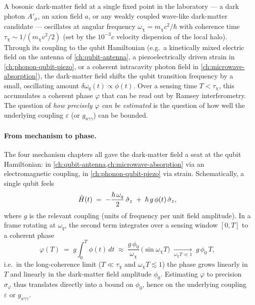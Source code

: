 \begin{phenomenon}
A bosonic dark-matter field at a single fixed point in the
laboratory --- a dark photon $A'_\mu$, an axion field $a$, or
any weakly coupled wave-like dark-matter candidate ---
oscillates at angular frequency $\omega_\chi=m_\chi c^2/\hbar$
with coherence time $\tau_\chi\sim 1/(m_\chi v^2/2)$ (set by the
$10^{-3}c$ velocity dispersion of the local halo). Through its
coupling to the qubit Hamiltonian (e.g.\ a kinetically mixed
electric field on the antenna of \cref{ch:qubit-antenna}, a
piezoelectrically driven strain in
\cref{ch:phonon-qubit-piezo}, or a coherent intracavity photon
field in \cref{ch:microwave-absorption}), the dark-matter
field shifts the qubit transition frequency by a small,
oscillating amount $\delta\omega_q(t)\propto\phi(t)$. Over a
sensing time $T<\tau_\chi$, this accumulates a coherent
phase $\varphi$ that can be read out by Ramsey
interferometry. The question of \emph{how precisely
$\varphi$ can be estimated} is the question of how well the
underlying coupling $\varepsilon$ (or $g_{a\gamma\gamma}$) can
be bounded.
\end{phenomenon}

\paragraph{From mechanism to phase.}
The four mechanism chapters all gave the dark-matter field a
seat at the qubit Hamiltonian: in
\cref{ch:qubit-antenna,ch:microwave-absorption} via an
electromagnetic coupling, in \cref{ch:phonon-qubit-piezo} via
strain. Schematically, a single qubit feels
\begin{equation}
\label{eq:dm-phase-hamiltonian}
\hat{H}(t) \;=\; -\frac{\hbar\,\omega_q}{2}\,\hat\sigma_z
\;+\; \hbar\,g\,\phi(t)\,\hat\sigma_z,
\end{equation}
where $g$ is the relevant coupling (units of frequency per unit
field amplitude). In a frame rotating at $\omega_q$, the second
term integrates over a sensing window $[0,T]$ to a coherent
phase
\begin{equation}
\label{eq:dm-phase-integral}
\varphi(T) \;=\; g \int_0^T\! \phi(t)\,dt \;\approx\;
\frac{g\,\phi_0}{\omega_\chi}\,
\bigl(\sin\omega_\chi T\bigr)
\;\xrightarrow[\omega_\chi T\ll 1]{}\;
g\,\phi_0\,T,
\end{equation}
i.e.\ in the long-coherence limit ($T\ll\tau_\chi$ and
$\omega_\chi T\lesssim 1$) the phase grows linearly in $T$ and
linearly in the dark-matter field amplitude $\phi_0$. Estimating
$\varphi$ to precision $\sigma_\varphi$ thus translates directly
into a bound on $\phi_0$, hence on the underlying coupling
$\varepsilon$ or $g_{a\gamma\gamma}$.

